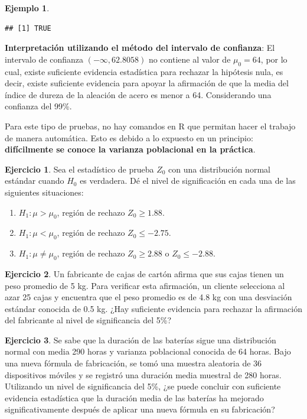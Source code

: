\documentclass[
  11pt,
]{book}
\providecommand{\tightlist}{%
  \setlength{\itemsep}{0pt}\setlength{\parskip}{0pt}}
\theoremstyle{definition}
\theoremstyle{definition}
\newtheorem{example}{Ejemplo}[chapter]
\theoremstyle{definition}
\newtheorem{exercise}{Ejercicio}[chapter]
\theoremstyle{definition}
\theoremstyle{remark}
\begin{document}
\begin{example}
\begin{enumerate}
\begin{verbatim}
## [1] TRUE
\end{verbatim}

  \textbf{Interpretación utilizando el método del intervalo de confianza}: El intervalo de confianza \((-\infty, 62.8058)\) no contiene al valor de \(\mu_0 = 64\), por lo cual, existe suficiente evidencia estadística para rechazar la hipótesis nula, es decir, existe suficiente evidencia para apoyar la afirmación de que la media del índice de dureza de la aleación de acero es menor a 64. Considerando una confianza del 99\%.
\end{enumerate}

\end{example}

Para este tipo de pruebas, no hay comandos en R que permitan hacer el trabajo de manera automática. Esto es debido a lo expuesto en un principio: \textbf{difícilmente se conoce la varianza poblacional en la práctica}.

\begin{exercise}

Sea el estadístico de prueba \(Z_0\) con una distribución normal estándar cuando \(H_0\) es verdadera. Dé el nivel de significación en cada una de las siguientes situaciones:

\begin{enumerate}
\def\labelenumi{\alph{enumi}.}
\tightlist
\item
  \(H_1: \mu > \mu_0\), región de rechazo \(Z_0\geq 1.88\).
\item
  \(H_1: \mu < \mu_0\), región de rechazo \(Z_0\leq -2.75\).
\item
  \(H_1: \mu \neq \mu_0\), región de rechazo \(Z_0\geq 2.88\) o \(Z_0\leq -2.88\).
\end{enumerate}

\end{exercise}

\begin{exercise}
Un fabricante de cajas de cartón afirma que sus cajas tienen un peso promedio de 5 kg. Para verificar esta afirmación, un cliente selecciona al azar 25 cajas y encuentra que el peso promedio es de 4.8 kg con una desviación estándar conocida de 0.5 kg. ¿Hay suficiente evidencia para rechazar la afirmación del fabricante al nivel de significancia del 5\%?
\end{exercise}

\begin{exercise}
Se sabe que la duración de las baterías sigue una distribución normal con media 290 horas y varianza poblacional conocida de 64 horas. Bajo una nueva fórmula de fabricación, se tomó una muestra aleatoria de 36 dispositivos móviles y se registró una duración media muestral de 280 horas. Utilizando un nivel de significancia del 5\%, ¿se puede concluir con suficiente evidencia estadística que la duración media de las baterías ha mejorado significativamente después de aplicar una nueva fórmula en su fabricación?
\end{exercise}
\end{document}
